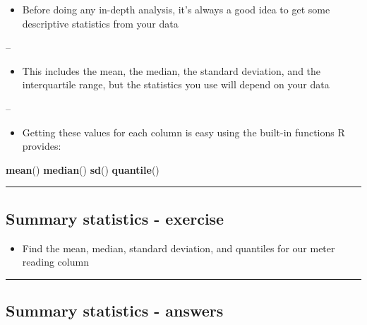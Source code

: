 \documentclass[]{article}
\newenvironment{Shaded}{\begin{snugshade}}{\end{snugshade}}
\newcommand{\KeywordTok}[1]{\textcolor[rgb]{0.13,0.29,0.53}{\textbf{#1}}}
\newcommand{\NormalTok}[1]{#1}
\providecommand{\tightlist}{%
  \setlength{\itemsep}{0pt}\setlength{\parskip}{0pt}}
\begin{document}
\begin{itemize}
\tightlist
\item
  Before doing any in-depth analysis, it's always a good idea to get
  some descriptive statistics from your data
\end{itemize}

--

\begin{itemize}
\tightlist
\item
  This includes the mean, the median, the standard deviation, and the
  interquartile range, but the statistics you use will depend on your
  data
\end{itemize}

--

\begin{itemize}
\tightlist
\item
  Getting these values for each column is easy using the built-in
  functions R provides:
\end{itemize}

\begin{Shaded}
\begin{Highlighting}[]
\KeywordTok{mean}\NormalTok{()}
\KeywordTok{median}\NormalTok{()}
\KeywordTok{sd}\NormalTok{()}
\KeywordTok{quantile}\NormalTok{()}
\end{Highlighting}
\end{Shaded}

\begin{center}\rule{0.5\linewidth}{\linethickness}\end{center}

\hypertarget{summary-statistics---exercise}{%
\subsection{Summary statistics -
exercise}\label{summary-statistics---exercise}}

\begin{itemize}
\tightlist
\item
  Find the mean, median, standard deviation, and quantiles for our meter
  reading column
\end{itemize}

\begin{center}\rule{0.5\linewidth}{\linethickness}\end{center}

\hypertarget{summary-statistics---answers}{%
\subsection{Summary statistics -
answers}\label{summary-statistics---answers}}
\end{document}
